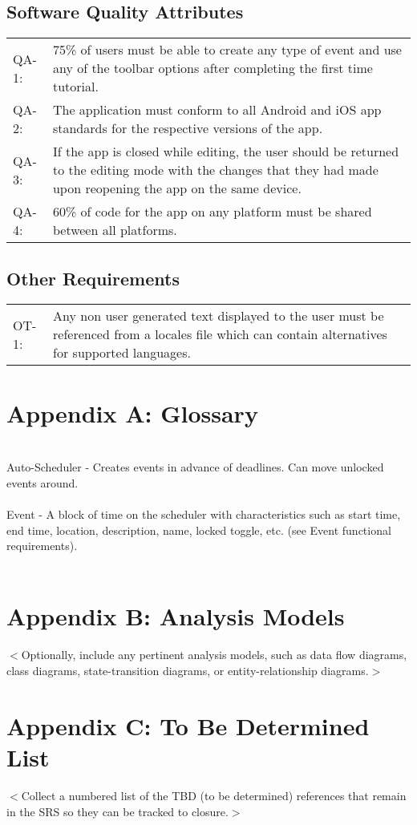 \documentclass{scrreprt}
\begin{document}
\section{Software Quality Attributes}
\begin{center}
\begin{tabular}{ p{1.5cm} p{13cm} }
QA-1: & 75\% of users must be able to create any type of event and use any of the
toolbar options after completing the first time tutorial.\\
QA-2: & The application must conform to all Android and iOS app standards for the
respective versions of the app.\\
QA-3: & If the app is closed while editing, the user should be returned to the editing
mode with the changes that they had made upon reopening the app on the same device.\\
QA-4: & 60\% of code for the app on any platform must be shared between all platforms.
\end{tabular}
\end{center}

\section{Other Requirements}
\begin{center}
\begin{tabular}{ p{1.5cm} p{13cm} }
OT-1: & Any non user generated text displayed to the user must be referenced from
a locales file which can contain alternatives for supported languages.\\
\end{tabular}
\end{center}

\chapter{Appendix A: Glossary}
\\
Auto-Scheduler - Creates events in advance of deadlines. Can move unlocked events around.\\
\\
Event - A block of time on the scheduler with characteristics such as start time, end time, 
location, description, name, locked toggle, etc. (see Event functional requirements).\\
\\

\chapter{Appendix B: Analysis Models}
$<$Optionally, include any pertinent analysis models, such as data flow
diagrams, class diagrams, state-transition diagrams, or entity-relationship
diagrams.$>$

\chapter{Appendix C: To Be Determined List}
$<$Collect a numbered list of the TBD (to be determined) references that remain
in the SRS so they can be tracked to closure.$>$
\end{document}
